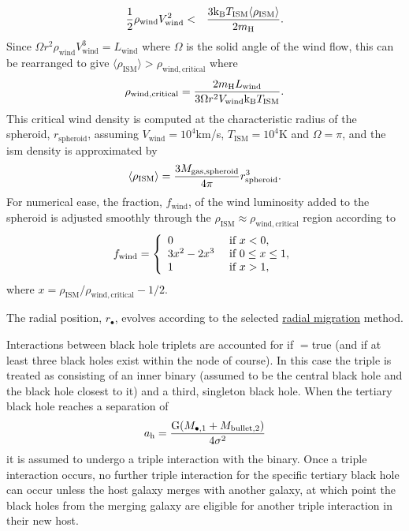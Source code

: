 \begin{description}
\begin{eqnarray}
 \frac{1}{2}\rho_\mathrm{wind} V_\mathrm{wind}^2 &<& {3 \mathrm{k_B} T_\mathrm{ISM} \langle \rho_\mathrm{ISM}\rangle \over 2 m_\mathrm{H}}.
\end{eqnarray}
Since $\Omega r^2 \rho_\mathrm{wind} V_\mathrm{wind}^3 = L_\mathrm{wind}$ where $\Omega$ is the solid angle of the wind flow, this can be rearranged to give $\langle\rho_\mathrm{ISM}\rangle > \rho_\mathrm{wind, critical}$ where
\begin{equation}
\rho_\mathrm{wind,critical} = {2 m_\mathrm{H} L_\mathrm{wind} \over 3 \Omega r^2 V_\mathrm{wind} \mathrm{k_B} T_\mathrm{ISM}}.
\end{equation}
This critical wind density is computed at the characteristic radius of the spheroid, $r_\mathrm{spheroid}$, assuming $V_\mathrm{wind}=10^4$km/s, $T_\mathrm{ISM}=10^4$K and $\Omega=\pi$, and the \gls{ism} density is approximated by
\begin{equation}
 \langle\rho_\mathrm{ISM}\rangle = {3 M_\mathrm{gas, spheroid} \over 4 \pi} r_\mathrm{spheroid}^3.
\end{equation}
For numerical ease, the fraction, $f_\mathrm{wind}$, of the wind luminosity added to the spheroid is adjusted smoothly through the $\rho_\mathrm{ISM}\approx\rho_\mathrm{wind,critical}$ region according to
\begin{equation}
 f_\mathrm{wind} = \left\{ \begin{array}{ll} 0 & \hbox{ if } x < 0, \\ 3x^2-2x^3 & \hbox{ if } 0 \le x \le 1, \\ 1 & \hbox{ if } x > 1, \end{array} \right.
\end{equation}
where $x=\rho_\mathrm{ISM}/\rho_\mathrm{wind,critical}-1/2$.
\end{description}

The radial position, $r_\bullet$, evolves according to the selected \href{https://github.com/galacticusorg/galacticus/releases/download/masterRelease/Galacticus_Development.pdf\#methods.blackHoleBinarySeparationGrowthRate}{radial migration} method.

Interactions between black hole triplets are accounted for if {\normalfont \ttfamily [tripleBlackHoleInteraction]}$=${\normalfont \ttfamily true} (and if at least three black holes exist within the \gls{node} of course). In this case the triple is treated as consisting of an inner binary (assumed to be the central black hole and the black hole closest to it) and a third, singleton black hole. When the tertiary black hole reaches a separation of 
\begin{equation}
a_\mathrm{h}= {\mathrm{G} (M_{\bullet, 1} + M_\mathrm{bullet, 2}) \over 4 \sigma^2}
\end{equation}
it is assumed to undergo a triple interaction with the binary. Once a triple interaction occurs, no further triple interaction for the specific tertiary black hole can occur unless the host galaxy merges with another galaxy, at which point the black holes from the merging galaxy are eligible for another triple interaction in their new host.

